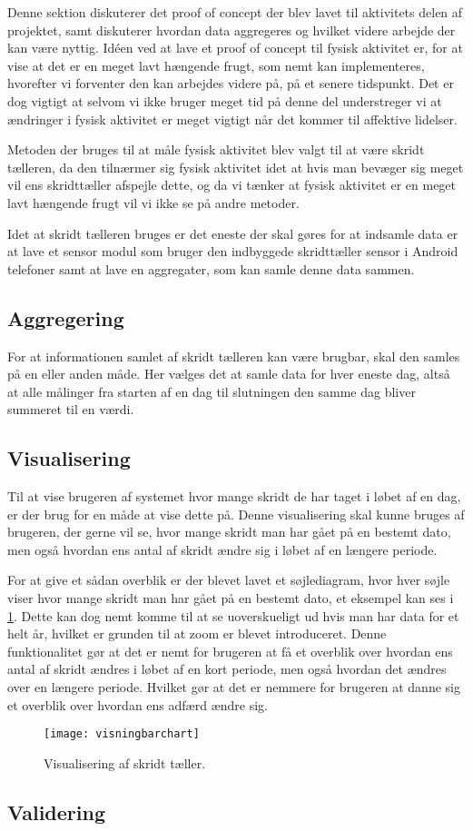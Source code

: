 Denne sektion diskuterer det proof of concept der blev lavet til aktivitets delen af projektet, samt diskuterer hvordan data aggregeres og hvilket videre arbejde der kan være nyttig. 
Idéen ved at lave et proof of concept til fysisk aktivitet er, for at vise at det er en meget lavt hængende frugt, som nemt kan implementeres, hvorefter vi forventer den kan arbejdes videre på, på et senere tidspunkt. 
Det er dog vigtigt at selvom vi ikke bruger meget tid på denne del understreger vi at ændringer i fysisk aktivitet er meget vigtigt når det kommer til affektive lidelser. 

Metoden der bruges til at måle fysisk aktivitet blev valgt til at være skridt tælleren, da den tilnærmer sig fysisk aktivitet idet at hvis man bevæger sig meget vil ens skridttæller afspejle dette, og da vi tænker at fysisk aktivitet er en meget lavt hængende frugt vil vi ikke se på andre metoder.

Idet at skridt tælleren bruges er det eneste der skal gøres for at indsamle data er at lave et sensor modul som bruger den indbyggede skridttæller sensor i Android telefoner samt at lave en aggregater, som kan samle denne data sammen. 

\subsection{Aggregering}
For at informationen samlet af skridt tælleren kan være brugbar, skal den samles på en eller anden måde.
Her vælges det at samle data for hver eneste dag, altså at alle målinger fra starten af en dag til slutningen den samme dag bliver summeret til en værdi.

\subsection{Visualisering}\label{sec:aktivitetVis}
Til at vise brugeren af systemet hvor mange skridt de har taget i løbet af en dag, er der brug for en måde at vise dette på.
Denne visualisering skal kunne bruges af brugeren, der gerne vil se, hvor mange skridt man har gået på en bestemt dato, men også hvordan ens antal af skridt ændre sig i løbet af en længere periode.

For at give et sådan overblik er der blevet lavet et søjlediagram, hvor hver søjle viser hvor mange skridt man har gået på en bestemt dato, et eksempel kan ses i \cref{fig:skridttaeller}.
Dette kan dog nemt komme til at se uoverskueligt ud hvis man har data for et helt år, hvilket er grunden til at zoom er blevet introduceret.
Denne funktionalitet gør at det er nemt for brugeren at få et overblik over hvordan ens antal af skridt ændres i løbet af en kort periode, men også hvordan det ændres over en længere periode.
Hvilket gør at det er nemmere for brugeren at danne sig et overblik over hvordan ens adfærd ændre sig.

\begin{figure}[h]
	\centering
	\texttt{[image: visningbarchart]}
	\caption{Visualisering af skridt tæller.}
	\label{fig:skridttaeller}
\end{figure}

\subsection{Validering}